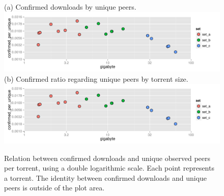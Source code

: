 \documentclass[10pt, a4paper, twoside, headsepline]{scrbook}
\renewcommand{\_}{\origunderscore\allowbreak}
\begin{document}
\begin{figure}
\centering
(a) Confirmed downloads by unique peers.
\includegraphics[width=\textwidth, page=2]{../result/2015-08-30_20-combined_download_confirmed_unique}
(b) Confirmed ratio regarding unique peers by torrent size.
\includegraphics[width=\textwidth, page=1]{../result/2015-08-30_20-combined_download_confirmed_unique}
\caption[Download numbers: Confirmed vs. unique peers]{Relation between confirmed downloads and unique observed peers per torrent, using a double logarithmic scale. Each point represents a torrent. The identity between confirmed downloads and unique peers is outside of the plot area.}
\label{confirmed-unique}
\end{figure}
\end{document}

